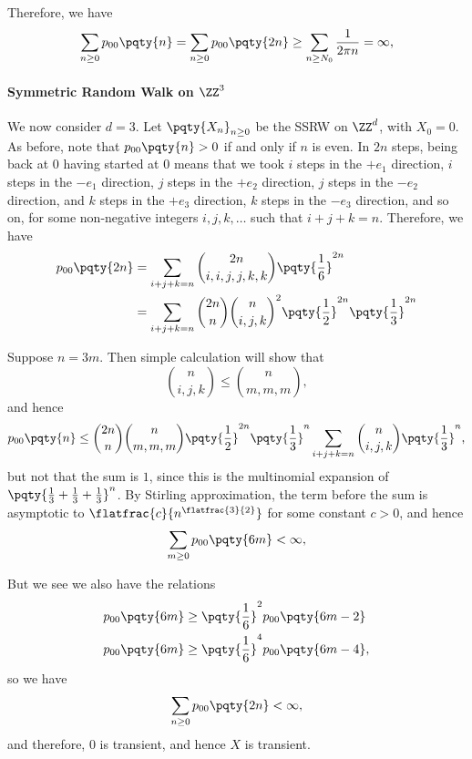 Therefore, we have
\[
    \sum_{n \geq 0} p_{00}\pqty{n} = \sum_{n \geq 0} p_{00}\pqty{2n} \geq \sum_{n \geq N_0} \frac{1}{2 \pi n} = \infty,
\]

\paragraph{Symmetric Random Walk on \(\ZZ^3\)} We now consider \(d = 3\). Let \(\pqty{X_n}_{n \geq 0}\) be the SSRW on \(\ZZ^d\), with \(X_0 = 0\). As before, note that \(p_{00}\pqty{n} > 0\) if and only if \(n\) is even. In \(2n\) steps, being back at \(0\) having started at \(0\) means that we took \(i\) steps in the \(+e_1\) direction, \(i\) steps in the \(-e_1\) direction, \(j\) steps in the \(+e_2\) direction, \(j\) steps in the \(-e_2\) direction, and \(k\) steps in the \(+e_3\) direction, \(k\) steps in the \(-e_3\) direction, and so on, for some non-negative integers \(i, j, k, \ldots\) such that \(i + j + k = n\). Therefore, we have
\begin{align*}
    p_{00} \pqty{2n} &= \sum_{\substack{i + j + k = n}} \binom{2n}{i, i, j, j, k, k} \pqty{\frac{1}{6}}^{2n} \\
    &= \sum_{i + j + k = n} \binom{2n}{n} \binom{n}{i, j, k}^2 \pqty{\frac{1}{2}}^{2n} \pqty{\frac{1}{3}}^{2n} \\
\end{align*}

Suppose \(n = 3m\). Then simple calculation will show that
\[
    \binom{n}{i, j, k} \leq \binom{n}{m, m, m},
\]
and hence
\[
    p_{00} \pqty{n} \leq \binom{2n}{n} \binom{n}{m, m, m} \pqty{\frac{1}{2}}^{2n} \pqty{\frac{1}{3}}^{n} \sum_{i + j + k = n} \binom{n}{i, j, k} \pqty{\frac{1}{3}}^{n},
\]
but not that the sum is \(1\), since this is the multinomial expansion of \(\pqty{\frac{1}{3} + \frac{1}{3} + \frac{1}{3}}^n\). By Stirling approximation, the term before the sum is asymptotic to \(\flatfrac{c}{n^{\flatfrac{3}{2}}}\) for some constant \(c > 0\), and hence
\[
    \sum_{m \geq 0} p_{00}\pqty{6m} < \infty,
\]

But we see we also have the relations
\begin{align*}
    p_{00} \pqty{6m} &\geq \pqty{\frac{1}{6}}^2 p_{00} \pqty{6m - 2} \\
    p_{00} \pqty{6m} &\geq \pqty{\frac{1}{6}}^4 p_{00} \pqty{6m - 4},
\end{align*}
so we have
\[
    \sum_{n \geq 0} p_{00} \pqty{2n} < \infty,
\]
and therefore, \(0\) is transient, and hence \(X\) is transient.
